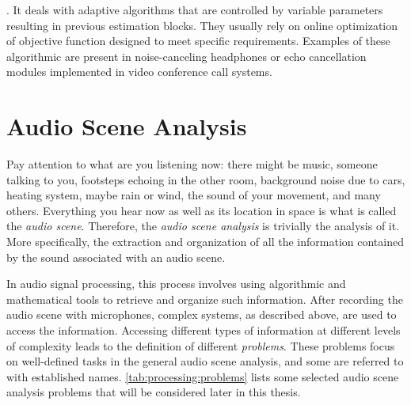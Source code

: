 .
    It deals with adaptive algorithms that are controlled by variable parameters resulting in previous estimation blocks.
    They usually rely on online optimization of objective function designed to meet specific requirements.
    Examples of these algorithmic are present in noise-canceling headphones or echo cancellation modules implemented in video conference call systems.

\section{Audio Scene Analysis}\label{sec:intro:scene}
Pay attention to what are you listening now:
there might be music, someone talking to you, footsteps echoing in the other room, background noise due to cars, heating system, maybe rain or wind, the sound of your movement, and many others.
Everything you hear now as well as its location in space is what is called the \textit{audio scene}.
Therefore, the \textit{audio scene analysis} is trivially the analysis of it.
More specifically, the extraction and organization of all the information contained by the sound associated with an audio scene.

\mynewline
In audio signal processing, this process involves using algorithmic and mathematical tools to retrieve and organize such information.
After recording the audio scene with microphones, complex systems, as described above, are used to access the information.
Accessing different types of information at different levels of complexity leads to the definition of different \textit{problems}.
These problems focus on well-defined tasks in the general audio scene analysis, and some are referred to with established names.
\cref{tab:processing:problems} lists some selected audio scene analysis problems that will be considered later in this thesis.

